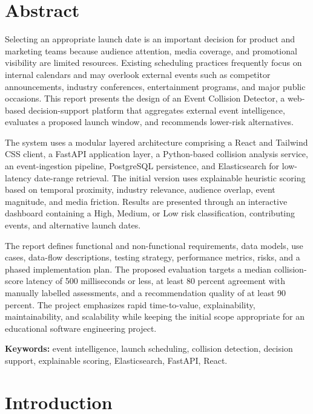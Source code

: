 \documentclass[12pt]{article}
\begin{document}
\section*{Abstract}
Selecting an appropriate launch date is an important decision for product and marketing teams because audience attention, media coverage, and promotional visibility are limited resources. Existing scheduling practices frequently focus on internal calendars and may overlook external events such as competitor announcements, industry conferences, entertainment programs, and major public occasions. This report presents the design of an Event Collision Detector, a web-based decision-support platform that aggregates external event intelligence, evaluates a proposed launch window, and recommends lower-risk alternatives.

The system uses a modular layered architecture comprising a React and Tailwind CSS client, a FastAPI application layer, a Python-based collision analysis service, an event-ingestion pipeline, PostgreSQL persistence, and Elasticsearch for low-latency date-range retrieval. The initial version uses explainable heuristic scoring based on temporal proximity, industry relevance, audience overlap, event magnitude, and media friction. Results are presented through an interactive dashboard containing a High, Medium, or Low risk classification, contributing events, and alternative launch dates.

The report defines functional and non-functional requirements, data models, use cases, data-flow descriptions, testing strategy, performance metrics, risks, and a phased implementation plan. The proposed evaluation targets a median collision-score latency of 500 milliseconds or less, at least 80 percent agreement with manually labelled assessments, and a recommendation quality of at least 90 percent. The project emphasizes rapid time-to-value, explainability, maintainability, and scalability while keeping the initial scope appropriate for an educational software engineering project.

\textbf{Keywords:} event intelligence, launch scheduling, collision detection, decision support, explainable scoring, Elasticsearch, FastAPI, React.

\tableofcontents
\newpage
{}

\section{Introduction}
\end{document}
